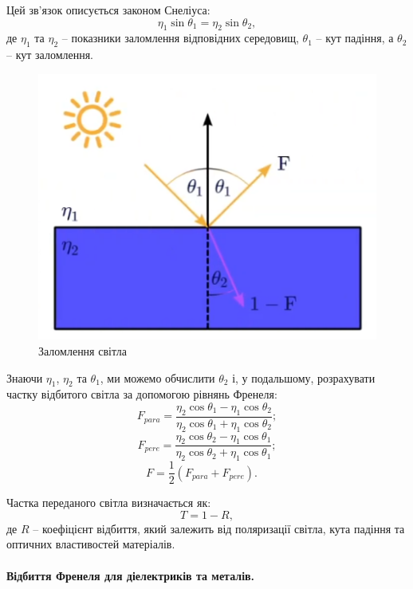 Цей зв’язок описується законом Снеліуса:
\begin{equation*}
    \eta_1 \sin \theta_1 = \eta_2 \sin \theta_2,
\end{equation*}
де $\eta_1$ та $\eta_2$ -- показники заломлення відповідних середовищ, $\theta_1$ -- кут падіння, а $\theta_2$ -- кут заломлення.


 \begin{figure}[h]
  \centering
  \includegraphics[scale=0.75]{Pictures/Snells.png}
  \caption{Заломлення світла}
  \label{fig:Snells}
\end{figure}

Знаючи $\eta_1$, $\eta_2$ та $\theta_1$, ми можемо обчислити $\theta_2$ і, у подальшому, розрахувати частку відбитого світла за допомогою рівнянь Френеля:
\begin{equation*}
F_{para} = \frac{\eta_2\cos\theta_1 - \eta_1\cos\theta_2}{\eta_2\cos\theta_1 + \eta_1\cos\theta_2};
\end{equation*}
\begin{equation*}
F_{pere} = \frac{\eta_2\cos\theta_2 - \eta_1\cos\theta_1}{\eta_2\cos\theta_2 + \eta_1\cos\theta_1};
\end{equation*}
\begin{equation}
\label{eq:fresnel}
F = \frac{1}{2}(F_{para} + F_{pere}).\quad
\end{equation}

Частка переданого світла визначається як:
\begin{equation*}
    T = 1 - R,
\end{equation*}
де $R$ -- коефіцієнт відбиття, який залежить від поляризації світла, кута падіння та оптичних властивостей матеріалів.
\paragraph{Відбиття Френеля для діелектриків та металів.}

